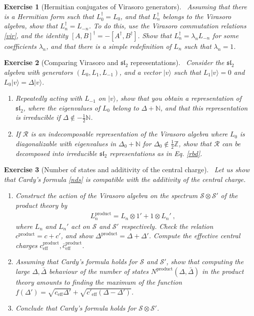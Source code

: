 \documentclass[12pt, a4paper, notitlepage, twoside]{report}
\numberwithin{equation}{section}
\theoremstyle{break}
\newtheorem{exo}{Exercise}[chapter]
\begin{document}
\begin{exo}[Hermitian conjugates of Virasoro generators]
 ~\label{exolnd}
Assuming that there is a Hermitian form such that $L_0^\dagger = L_0$, and that $L_n^\dagger$ belongs to the Virasoro algebra, show that $L_n^\dagger = L_{-n}$. To do this, use the Virasoro commutation relations \eqref{vir}, and the identity $[A,B]^\dagger = -[A^\dagger, B^\dagger]$. Show that $L_n^\dagger = \lambda_n L_{-n}$ for some coefficients $\lambda_n$, and that there is a simple redefinition of $L_n$ such that $\lambda_n=1$.
\end{exo}

\begin{exo}[Comparing Virasoro and $\mathfrak{sl}_2$ representations]
 ~\label{exodis}
Consider the $\mathfrak{sl}_2$ algebra with generators $(L_0,L_1,L_{-1})$, and a vector $|v\rangle$ such that $L_1|v\rangle = 0 $ and $L_0|v\rangle = \Delta |v\rangle$.
\begin{enumerate}
 \item 
Repeatedly acting with $L_{-1}$ on $|v\rangle$, show that you obtain a representation of $\mathfrak{sl}_2$, where the eigenvalues of $L_0$ belong to $\Delta+{\mathbb{N}}$, and that this representation is irreducible if $\Delta\notin -\frac12 \mathbb{N}$.
\item
If $\mathcal{R}$ is an indecomposable representation of the Virasoro algebra where $L_0$ is diagonalizable with eigenvalues in $\Delta_0+\mathbb{N}$ for $\Delta_0\notin\frac12 \mathbb{Z}$, show that $\mathcal{R}$ can be decomposed into irreducible $\mathfrak{sl}_2$ representations as in Eq. \eqref{rbd}.
\end{enumerate}
\end{exo}


\begin{exo}[Number of states and additivity of the central charge]
 ~\label{exoacf} 
Let us show that Cardy's formula \eqref{nds} is compatible with the additivity of the central charge.
\begin{enumerate}
 \item Construct the action of the Virasoro algebra on the spectrum $\mathcal{S}\otimes \mathcal{S}'$ of the product theory by 
\begin{align}
 L_n^\text{product} = L_n\otimes 1' + 1\otimes L_n'\ ,
\end{align}
where $L_n$ and $L_n'$ act on $\mathcal{S}$ and $\mathcal{S}'$ respectively.
Check the relation $c^\text{product} = c+c'$, and show $\Delta^\text{product} = \Delta+\Delta'$.
Compute the effective central charges $c^\text{product}_\text{eff}, \bar c^\text{product}_\text{eff}$.
\item 
Assuming that Cardy's formula holds for $\mathcal{S}$ and $\mathcal{S}'$, show that computing the large $\Delta,\bar\Delta$ behaviour of the number of states $N^\text{product}(\Delta,\bar\Delta)$ in the product theory amounts to finding the maximum of the function $f(\Delta') = \sqrt{c_\text{eff}\Delta'} +\sqrt{c'_\text{eff}(\Delta-\Delta')}$.
\item
Conclude that Cardy's formula holds for $\mathcal{S}\otimes \mathcal{S}'$.
\end{enumerate}
\end{exo}
\end{document}
